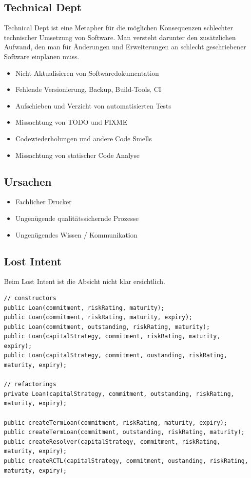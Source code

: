 \subsection{Technical Dept}
Technical Dept ist eine Metapher für die möglichen Konsequenzen schlechter technischer Umsetzung von Software. Man versteht darunter den zusätzlichen Aufwand, den man für Änderungen und Erweiterungen an schlecht geschriebener Software einplanen muss. 
\begin{itemize}
	\item Nicht Aktualisieren von Softwaredokumentation
	\item Fehlende Versionierung, Backup, Build-Tools, CI
	\item Aufschieben und Verzicht von automatisierten Tests
	\item Missachtung von TODO und FIXME
	\item Codewiederholungen und andere Code Smells
	\item Missachtung von statischer Code Analyse
\end{itemize}

\subsection{Ursachen}
\begin{itemize}
	\item Fachlicher Drucker
	\item Ungenügende qualitätssichernde Prozesse
	\item Ungenügendes Wissen / Kommunikation
\end{itemize}

\subsection{Lost Intent}
Beim Lost Intent ist die Absicht nicht klar ersichtlich.
\begin{lstlisting}
// constructors
public Loan(commitment, riskRating, maturity);
public Loan(commitment, riskRating, maturity, expiry);
public Loan(commitment, outstanding, riskRating, maturity);
public Loan(capitalStrategy, commitment, riskRating, maturity, expiry);
public Loan(capitalStrategy, commitment, oustanding, riskRating, maturity, expiry);

// refactorings
private Loan(capitalStrategy, commitment, outstanding, riskRating, maturity, expiry);

public createTermLoan(commitment, riskRating, maturity, expiry);
public createTermLoan(commitment, outstanding, riskRating, maturity);
public createResolver(capitalStrategy, commitment, riskRating, maturity, expiry);
public createRCTL(capitalStrategy, commitment, oustanding, riskRating, maturity, expiry);
\end{lstlisting}

